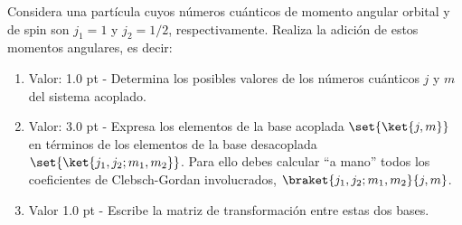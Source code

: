 \documentclass[./../main.tex]{subfiles}
\begin{document}
    \begin{exercise}
        Considera una partícula cuyos números cuánticos de momento angular orbital y de spin son \(j_{1} = 1\) y \(j_{2} = 1/2\), respectivamente. Realiza la adición de estos momentos angulares, es decir:

        \begin{enumerate}[label=(\alph*)]
            \item Valor: 1.0 pt - Determina los posibles valores de los números cuánticos \(j\) y \(m\) del sistema acoplado.
            \item Valor: 3.0 pt - Expresa los elementos de la base acoplada \(\set{\ket{j,m}}\) en términos de los elementos de la base desacoplada \(\set{\ket{j_{1}, j_{2}; m_{1}, m_{2}}}\). Para ello debes calcular ``a mano'' todos los coeficientes de Clebsch-Gordan involucrados, \(\braket{j_{1},j_{2}; m_{1}, m_{2}}{j,m}\).
            \item Valor 1.0 pt - Escribe la matriz de transformación entre estas dos bases.
        \end{enumerate}
    \end{exercise} 
\end{document}

